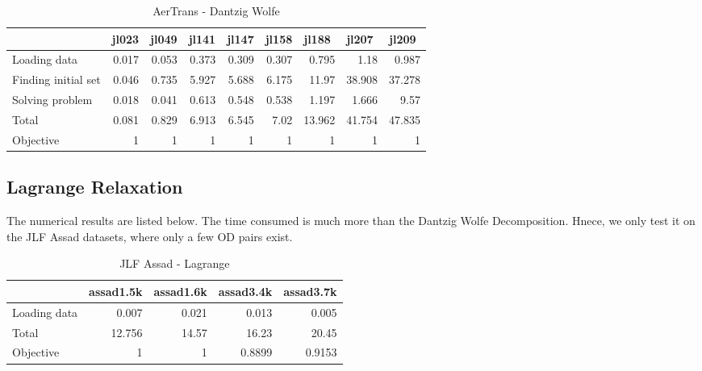 \begin{table}[htbp]
  \centering
  \caption{AerTrans - Dantzig Wolfe}
    \begin{tabular}{lrrrrrrrr}
    \toprule
          & \multicolumn{1}{l}{jl023} & \multicolumn{1}{l}{jl049} & \multicolumn{1}{l}{jl141} & \multicolumn{1}{l}{jl147} & \multicolumn{1}{l}{jl158} & \multicolumn{1}{l}{jl188} & \multicolumn{1}{l}{jl207} & \multicolumn{1}{l}{jl209} \\
          \midrule
    Loading data & 0.017 & 0.053 & 0.373 & 0.309 & 0.307 & 0.795 & 1.18  & 0.987 \\
    Finding initial set & 0.046 & 0.735 & 5.927 & 5.688 & 6.175 & 11.97 & 38.908 & 37.278 \\
    Solving problem & 0.018 & 0.041 & 0.613 & 0.548 & 0.538 & 1.197 & 1.666 & 9.57 \\
    Total & 0.081 & 0.829 & 6.913 & 6.545 & 7.02  & 13.962 & 41.754 & 47.835 \\
    Objective & 1& 1& 1& 1& 1& 1&1&1\\
    \bottomrule
    \end{tabular}%
  \label{tab:addlabel}%
\end{table}%

\subsection{Lagrange Relaxation}

The numerical results are listed below. The time consumed is much more than the Dantzig Wolfe Decomposition. Hnece, we only test it on the JLF Assad datasets, where only a few OD pairs exist.


\begin{table}[htbp]
  \centering
  \caption{JLF Assad - Lagrange}
    \begin{tabular}{lrrrr}
    \toprule
          & \multicolumn{1}{l}{assad1.5k} & \multicolumn{1}{l}{assad1.6k} & \multicolumn{1}{l}{assad3.4k} & \multicolumn{1}{l}{assad3.7k} \\
              \midrule

    Loading data & 0.007 & 0.021 & 0.013 & 0.005 \\

    Total & 12.756 & 14.57 & 16.23 & 20.45 \\
    Objective & 1&1 &0.8899& 0.9153\\
    \bottomrule
    \end{tabular}%
  \label{tab:addlabel}%
\end{table}%
